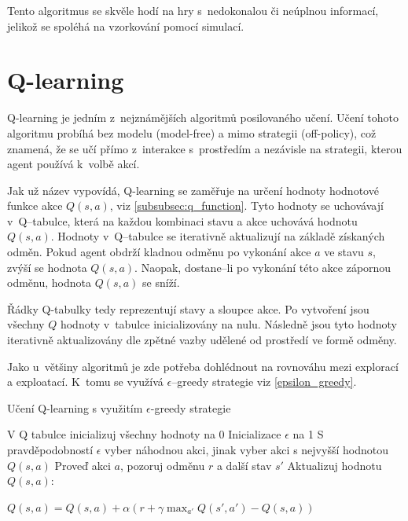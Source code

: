 Tento algoritmus se skvěle hodí na hry s~nedokonalou či neúplnou informací, jelikož se spoléhá na vzorkování pomocí simulací.

\section{Q-learning}\label{subsec:q-learning}

Q-learning je jedním z~nejznámějších algoritmů posilovaného učení.
Učení tohoto algoritmu probíhá bez modelu (model-free) a mimo strategii (off-policy), což znamená, že se učí přímo z~interakce s~prostředím a nezávisle na strategii, kterou agent používá k~volbě akcí.

Jak už název vypovídá, Q-learning se zaměřuje na určení hodnoty hodnotové funkce akce $Q(s, a)$, viz \ref{subsubsec:q_function}.
Tyto hodnoty se uchovávají v~Q--tabulce, která na každou kombinaci stavu a akce uchovává hodnotu $Q(s, a)$.
Hodnoty v~Q--tabulce se iterativně aktualizují na základě získaných odměn.
Pokud agent obdrží kladnou odměnu po vykonání akce $a$ ve stavu $s$, zvýší se hodnota $Q(s, a)$.
Naopak, dostane--li po vykonání této akce zápornou odměnu, hodnota $Q(s, a)$ se sníží.

Řádky Q-tabulky tedy reprezentují stavy a sloupce akce.
Po vytvoření jsou všechny $Q$ hodnoty v~tabulce inicializovány na nulu.
Následně jsou tyto hodnoty iterativně aktualizovány dle zpětné vazby udělené od prostředí ve formě odměny.

Jako u~většiny algoritmů je zde potřeba dohlédnout na rovnováhu mezi explorací a exploatací.
K~tomu se využívá $\epsilon$--greedy strategie viz \ref{epsilon_greedy}.

\begin{algorithm}[H]
  \caption{Učení Q-learning s využitím $\epsilon$-greedy strategie}
  \begin{algorithmic}[1]
  \State V Q tabulce inicializuj všechny hodnoty na 0
  \State Inicializace $\epsilon$ na 1
          \State S pravděpodobností $\epsilon$ vyber náhodnou akci, jinak vyber akci s nejvyšší hodnotou $Q(s, a)$
          \State Proveď akci $a$, pozoruj odměnu $r$ a další stav $s'$
          \State Aktualizuj hodnotu $Q(s, a)$:\par
          $Q(s, a) = Q(s, a) + \alpha \left( r + \gamma \max_{a'} Q(s', a') - Q(s, a) \right)$
    \EndWhile
  \EndFor
  \end{algorithmic}
\end{algorithm}

